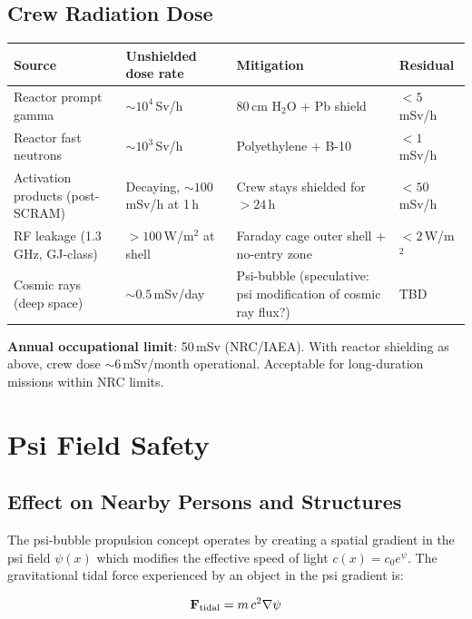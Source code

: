 \documentclass[11pt,a4paper]{article}
\begin{document}
\subsection{Crew Radiation Dose}

\begin{longtable}{p{0.30\tw}p{0.20\tw}p{0.30\tw}p{0.10\tw}}
\toprule
\textbf{Source} & \textbf{Unshielded dose rate} & \textbf{Mitigation} &
\textbf{Residual} \\
\midrule
\endhead
Reactor prompt gamma & $\sim 10^4$\,Sv/h & 80\,cm H$_2$O + Pb shield &
  $< 5$\,mSv/h \\
Reactor fast neutrons & $\sim 10^3$\,Sv/h & Polyethylene + B-10 &
  $< 1$\,mSv/h \\
Activation products (post-SCRAM) & Decaying, $\sim 100$\,mSv/h at 1\,h &
  Crew stays shielded for $> 24$\,h & $< 50$\,mSv/h \\
RF leakage (1.3\,GHz, GJ-class) & $>100$\,W/m$^2$ at shell & Faraday cage
  outer shell + no-entry zone & $< 2$\,W/m$^2$ \\
Cosmic rays (deep space) & $\sim 0.5$\,mSv/day & Psi-bubble
  (speculative: psi modification of cosmic ray flux?) &
  TBD \\
\bottomrule
\end{longtable}

\textbf{Annual occupational limit}: 50\,mSv (NRC/IAEA). With reactor
shielding as above, crew dose $\sim 6$\,mSv/month operational.
Acceptable for long-duration missions within NRC limits.

\section{Psi Field Safety}
\label{sec:psi_safety}

\subsection{Effect on Nearby Persons and Structures}

The psi-bubble propulsion concept operates by creating a spatial gradient
in the psi field $\psi(x)$ which modifies the effective speed of light
$c(x) = c_0 e^\psi$. The gravitational tidal force experienced by an
object in the psi gradient is:

\begin{equation}
  \mathbf{F}_{\rm tidal} = m \, c^2 \nabla\psi
\end{equation}
\end{document}
